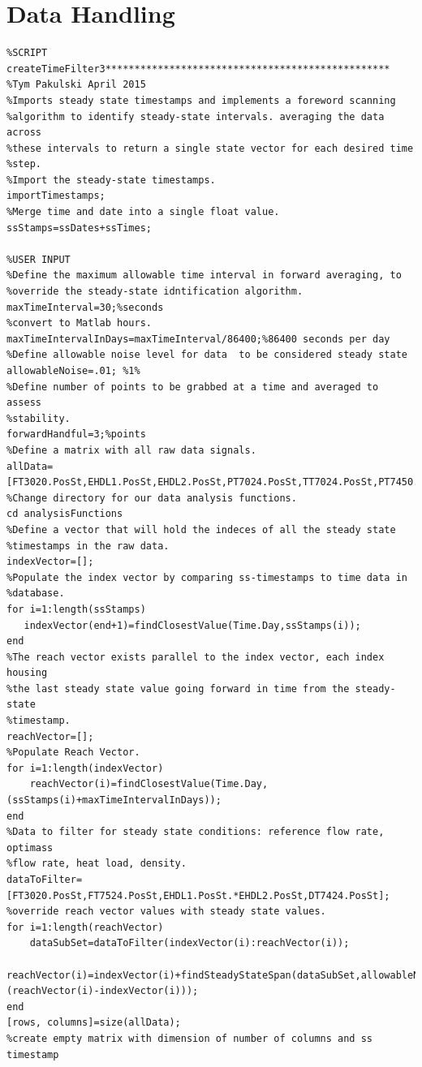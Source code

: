 \documentclass{report}
\begin{document}
\section{Data Handling}
\begin{verbatim}
%SCRIPT createTimeFilter3*************************************************
%Tym Pakulski April 2015
%Imports steady state timestamps and implements a foreword scanning
%algorithm to identify steady-state intervals. averaging the data across
%these intervals to return a single state vector for each desired time
%step.
%Import the steady-state timestamps.
importTimestamps;
%Merge time and date into a single float value.
ssStamps=ssDates+ssTimes;

%USER INPUT
%Define the maximum allowable time interval in forward averaging, to
%override the steady-state idntification algorithm.
maxTimeInterval=30;%seconds
%convert to Matlab hours.
maxTimeIntervalInDays=maxTimeInterval/86400;%86400 seconds per day
%Define allowable noise level for data  to be considered steady state
allowableNoise=.01; %1%
%Define number of points to be grabbed at a time and averaged to assess
%stability.
forwardHandful=3;%points
%Define a matrix with all raw data signals.
allData=[FT3020.PosSt,EHDL1.PosSt,EHDL2.PosSt,PT7024.PosSt,TT7024.PosSt,PT7450.PosSt,FT7524.PosSt,DT7424.PosSt,TT7424.PosSt,PT7056.PosSt,TT7056.PosSt];
%Change directory for our data analysis functions.
cd analysisFunctions
%Define a vector that will hold the indeces of all the steady state
%timestamps in the raw data.
indexVector=[];
%Populate the index vector by comparing ss-timestamps to time data in
%database.
for i=1:length(ssStamps)
   indexVector(end+1)=findClosestValue(Time.Day,ssStamps(i));
end
%The reach vector exists parallel to the index vector, each index housing
%the last steady state value going forward in time from the steady-state
%timestamp.
reachVector=[];
%Populate Reach Vector.
for i=1:length(indexVector)
    reachVector(i)=findClosestValue(Time.Day,(ssStamps(i)+maxTimeIntervalInDays));
end
%Data to filter for steady state conditions: reference flow rate, optimass
%flow rate, heat load, density.
dataToFilter=[FT3020.PosSt,FT7524.PosSt,EHDL1.PosSt.*EHDL2.PosSt,DT7424.PosSt];
%override reach vector values with steady state values.
for i=1:length(reachVector)
    dataSubSet=dataToFilter(indexVector(i):reachVector(i));
    reachVector(i)=indexVector(i)+findSteadyStateSpan(dataSubSet,allowableNoise,forwardHandful,(reachVector(i)-indexVector(i)));
end
[rows, columns]=size(allData);
%create empty matrix with dimension of number of columns and ss timestamp

\end{verbatim}
\end{document}
